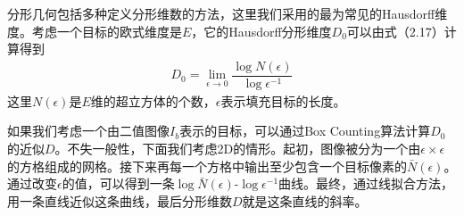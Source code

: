 \documentclass[supercite]{HustGraduPaper}
\begin{document}
\begin{sloppypar}
  分形几何包括多种定义分形维数的方法，这里我们采用的最为常见的Hausdorff维度。考虑一个目标的欧式维度是$E$，它的Hausdorff分形维度$D_0$可以由式（2.17）计算得到\begin{gather}
   D_0=\lim_{\epsilon\to 0}\dfrac{\log N(\epsilon)}{\log \epsilon^{-1}}
  \end{gather}
  这里$N(\epsilon)$是$E$维的超立方体的个数，$\epsilon$表示填充目标的长度。

  如果我们考虑一个由二值图像$I_b$表示的目标，可以通过Box Counting算法计算$D_0$的近似$D$。不失一般性，下面我们考虑2D的情形。起初，图像被分为一个由$\epsilon\times\epsilon$的方格组成的网格。接下来再每一个方格中输出至少包含一个目标像素的$\bar{N}(\epsilon)$。通过改变$\epsilon$的值，可以得到一条$\log\bar{N}(\epsilon)$-$\log\epsilon^{-1}$曲线。最终，通过线拟合方法，用一条直线近似这条曲线，最后分形维数$D$就是这条直线的斜率。


\end{sloppypar}
\end{document}
